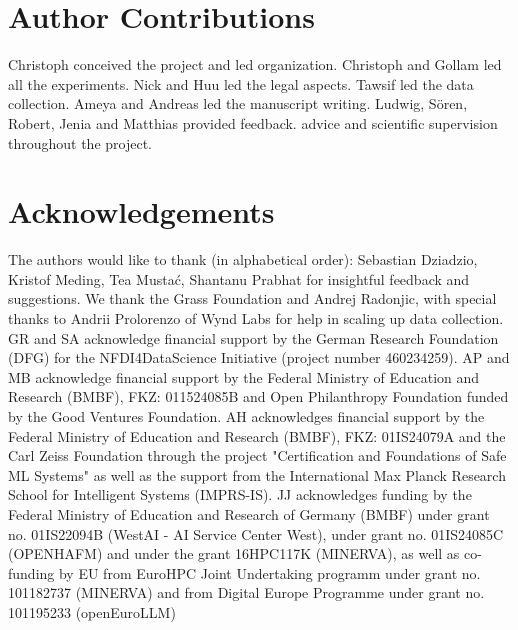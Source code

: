 \section*{Author Contributions}

Christoph conceived the project and led organization. Christoph and Gollam led all the experiments. Nick and Huu led the legal aspects. Tawsif led the data collection. Ameya and Andreas led the manuscript writing. Ludwig, Sören, Robert, Jenia and Matthias provided feedback. advice and scientific supervision throughout the project. 

\section*{Acknowledgements}

The authors would like to thank (in alphabetical order): Sebastian Dziadzio, Kristof Meding, Tea Mustać, Shantanu Prabhat for insightful feedback and suggestions.  We thank the Grass Foundation and Andrej Radonjic, with special thanks to Andrii Prolorenzo of Wynd Labs for help in scaling up data collection. GR and SA acknowledge financial support by the German Research Foundation (DFG) for the NFDI4DataScience Initiative (project number 460234259). AP and MB acknowledge financial support by the Federal Ministry of Education and Research (BMBF), FKZ: 011524085B and Open Philanthropy Foundation funded by the Good Ventures Foundation. AH acknowledges financial support by the Federal Ministry of Education and Research (BMBF), FKZ: 01IS24079A and the Carl Zeiss Foundation through the project "Certification and Foundations of Safe ML Systems" as well as the support from the International Max Planck Research School for Intelligent Systems (IMPRS-IS). JJ acknowledges funding by the Federal Ministry of Education and Research of Germany (BMBF) under grant no. 01IS22094B (WestAI - AI Service Center West), under grant no. 01IS24085C (OPENHAFM) and under the grant 16HPC117K (MINERVA), as well as co-funding by EU from EuroHPC Joint Undertaking programm under grant no. 101182737 (MINERVA) and from Digital Europe Programme under grant no. 101195233 (openEuroLLM) 